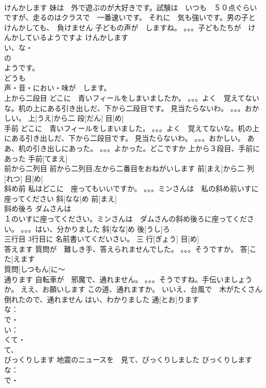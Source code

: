 \documentclass[8pt]{extreport}
\begin{document}
\begin{CJK}{UTF8}{min}
\\	けんかします	妹は　外で遊ぶのが大好きです。試験は　いつも　５０点ぐらいですが、走るのはクラスで　一番速いです。 それに　気も強いです。男の子と　けんかしても、　負けません 子どもの声が　しますね。 。。。子どもたちが　けんかしているようですよ	けんかします			
\\	い、な・
\\	の
\\	ようです。
\\	どうも
\\	声・音・におい・味が　します。
\\	上から二段目	どこに　青いフィールをしまいましたか。 。。。よく　覚えてないな。机の上にある引き出しだ、下から二段目です。 見当たらないわ。 。。。おかしい。	上[うえ]から二 段[だん] 目[め]			
\\	手前	どこに　青いフィールをしまいました。 。。。よく　覚えてないな。机の上にある引き出しだ、下から二段目です。 見当たらないわ。 。。。おかしい。 ああ、机の引き出しにあった。 。。。よかった。どこですか 上から３段目、手前にあった	手前[てまえ]					
\\	前から二列目	前から二列目,左から二番目をおねがいします	前[まえ]から二 列[れつ] 目[め]					
\\	斜め前	私はどこに　座ってもいいですか。 。。。ミンさんは　私の斜め前いすに座ってください	斜[なな]め 前[まえ]			
\\	斜め後ろ	ダムさんは　
\\	１のいすに座ってください。ミンさんは　ダムさんの斜め後ろに座ってください。 。。。はい、分かりました	斜[なな]め 後[うし]ろ			
\\	三行目	3行目に 名前書いてくだいさい。	三 行[ぎょう] 目[め]						
\\	答えます	質問が　難しき手、答えられませんでした。 。。。そうですか。	答[こた]えます				
\\	質問[しつもん]に～	
\\	通ります	自転車が　邪魔で、通れません。 。。。そうですね。手伝いましょうか。 ええ、お願いします この道、通れますか。 いいえ、台風で　木がたくさん　倒れたので、通れません はい、わかりました	通[とお]ります				
\\	な：
\\	で・
\\	い： 
\\	くて・
\\	て、
\\	びっくりします	地震のニュースを　見て、びっくりしました	びっくりします			
\\	な：
\\	で・

\end{CJK}
\end{document}
